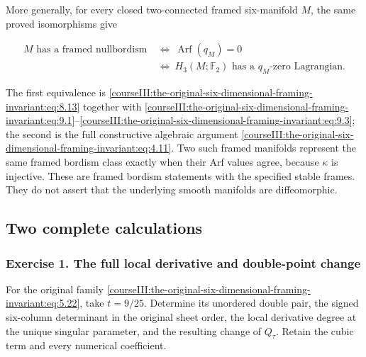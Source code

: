 More generally, for every closed two-connected framed six-manifold \(M\), the same proved isomorphisms give

\begin{equation}
\begin{split}
 M\text{ has a framed nullbordism}
   &\ \Longleftrightarrow\ \operatorname{Arf}(q_M)=0\\
   &\ \Longleftrightarrow\
       H_3(M;\mathbb F_2)\text{ has a }q_M\text{-zero Lagrangian}.
 \end{split}
 \label{courseIII:the-original-six-dimensional-framing-invariant:eq:9.5}
\end{equation}

The first equivalence is \eqref{courseIII:the-original-six-dimensional-framing-invariant:eq:8.13} together with \eqref{courseIII:the-original-six-dimensional-framing-invariant:eq:9.1}--\eqref{courseIII:the-original-six-dimensional-framing-invariant:eq:9.3}; the second is the full constructive algebraic argument \eqref{courseIII:the-original-six-dimensional-framing-invariant:eq:4.11}. Two such framed manifolds represent the same framed bordism class exactly when their Arf values agree, because \(\kappa\) is injective. These are framed bordism statements with the specified stable frames. They do not assert that the underlying smooth manifolds are diffeomorphic.

\subsection{Two complete calculations}
\label{courseIII:the-original-six-dimensional-framing-invariant:framed-six-exercises}

\label{courseIII:the-original-six-dimensional-framing-invariant:section-10}

\subsubsection{Exercise 1. The full local derivative and double-point change}
\label{courseIII:the-original-six-dimensional-framing-invariant:exercise-1}

\label{courseIII:framed6:10.1}

For the original family \eqref{courseIII:the-original-six-dimensional-framing-invariant:eq:5.22}, take \(t=9/25\). Determine its unordered double pair, the signed six-column determinant in the original sheet order, the local derivative degree at the unique singular parameter, and the resulting change of \(Q_\tau\). Retain the cubic term and every numerical coefficient.

